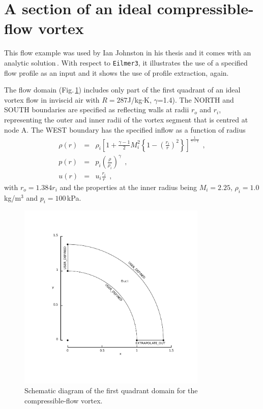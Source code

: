 \section{A section of an ideal compressible-flow vortex}
\label{vortex-sec}
%
This flow example was used by Ian Johnston in his thesis 
and it comes with an analytic solution\,\cite{aftosmis_etal_1995a}.
With respect to \texttt{Eilmer3}, it illustrates the use of a specified flow profile as an input
and it shows the use of profile extraction, again.

The flow domain (Fig.\,\ref{vortex-geometry-fig}) includes only part of 
the first quadrant of an ideal vortex flow in inviscid air 
with $R=287$J/kg$\cdot$K, $\gamma$=1.4).
The NORTH and SOUTH boundaries are specified as reflecting walls
at radii $r_o$ and $r_i$, representing the outer and inner radii of the
vortex segment that is centred at node A.
The WEST boundary has the specified inflow as a function of radius
\begin{eqnarray}
   \rho(r) & = & \rho_i \left[
             1 + \frac{\gamma - 1}{2} M_i^2 
             \left\{ 1 - \left( \frac{r_i}{r} \right)^2 \right\}
             \right]^\frac{1}{\gamma - 1} ~~, \nonumber\\
   p(r) & = & p_i \left( \frac{\rho}{\rho_i} \right)^{\gamma} ~~, \nonumber \\
   u(r) & = & u_i \frac{r_i}{r} ~~, \nonumber
\end{eqnarray}
with $r_o = 1.384 r_i$ and the properties at the inner radius being
$M_i = 2.25$, $\rho_i = 1.0$\,kg/m$^3$ and $p_i = 100$\,kPa.

\begin{figure}[htbp]
\begin{center}
\includegraphics[width=9cm, viewport=71 74 392 392]{../2D/vortex/vtx-layout.pdf}
\end{center}
\caption{Schematic diagram of the first quadrant domain for 
         the compressible-flow vortex.}
\label{vortex-geometry-fig}
\end{figure}

